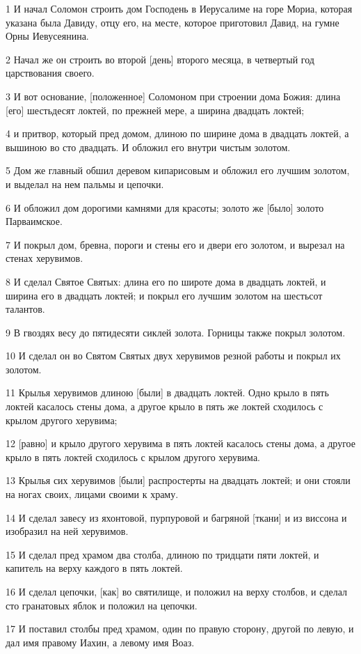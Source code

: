\par 1 И начал Соломон строить дом Господень в Иерусалиме на горе Мориа, которая указана была Давиду, отцу его, на месте, которое приготовил Давид, на гумне Орны Иевусеянина.
\par 2 Начал же он строить во второй [день] второго месяца, в четвертый год царствования своего.
\par 3 И вот основание, [положенное] Соломоном при строении дома Божия: длина [его] шестьдесят локтей, по прежней мере, а ширина двадцать локтей;
\par 4 и притвор, который пред домом, длиною по ширине дома в двадцать локтей, а вышиною во сто двадцать. И обложил его внутри чистым золотом.
\par 5 Дом же главный обшил деревом кипарисовым и обложил его лучшим золотом, и выделал на нем пальмы и цепочки.
\par 6 И обложил дом дорогими камнями для красоты; золото же [было] золото Парваимское.
\par 7 И покрыл дом, бревна, пороги и стены его и двери его золотом, и вырезал на стенах херувимов.
\par 8 И сделал Святое Святых: длина его по широте дома в двадцать локтей, и ширина его в двадцать локтей; и покрыл его лучшим золотом на шестьсот талантов.
\par 9 В гвоздях весу до пятидесяти сиклей золота. Горницы также покрыл золотом.
\par 10 И сделал он во Святом Святых двух херувимов резной работы и покрыл их золотом.
\par 11 Крылья херувимов длиною [были] в двадцать локтей. Одно крыло в пять локтей касалось стены дома, а другое крыло в пять же локтей сходилось с крылом другого херувима;
\par 12 [равно] и крыло другого херувима в пять локтей касалось стены дома, а другое крыло в пять локтей сходилось с крылом другого херувима.
\par 13 Крылья сих херувимов [были] распростерты на двадцать локтей; и они стояли на ногах своих, лицами своими к храму.
\par 14 И сделал завесу из яхонтовой, пурпуровой и багряной [ткани] и из виссона и изобразил на ней херувимов.
\par 15 И сделал пред храмом два столба, длиною по тридцати пяти локтей, и капитель на верху каждого в пять локтей.
\par 16 И сделал цепочки, [как] во святилище, и положил на верху столбов, и сделал сто гранатовых яблок и положил на цепочки.
\par 17 И поставил столбы пред храмом, один по правую сторону, другой по левую, и дал имя правому Иахин, а левому имя Воаз.

